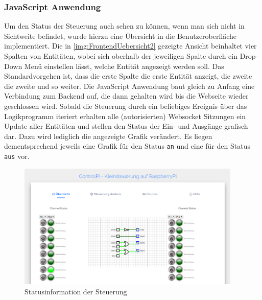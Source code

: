\subsubsection{JavaScript Anwendung}\label{chp:ums:JavaScriptFront}
Um den Status der Steuerung auch sehen zu können, wenn man sich nicht in Sichtweite befindet, wurde hierzu eine Übersicht in die Benutzeroberfläche implementiert. Die in \autoref{img:FrontendUebersicht2} gezeigte Ansicht beinhaltet vier Spalten von Entitäten, wobei sich oberhalb der jeweiligen Spalte durch ein Drop-Down Menü einstellen lässt, welche Entität angezeigt werden soll. Das Standardvorgehen ist, dass die erste Spalte die erste Entität anzeigt, die zweite die zweite und so weiter. Die JavaScript Anwendung baut gleich zu Anfang eine Verbindung zum Backend auf, die dann gehalten wird bis die Webseite wieder geschlossen wird. Sobald die Steuerung durch ein beliebiges Ereignis über das Logikprogramm iteriert erhalten alle (autorisierten) Websocket Sitzungen ein Update aller Entitäten und stellen den Status der Ein- und Ausgänge grafisch dar. Dazu wird lediglich die angezeigte Grafik verändert. Es liegen dementsprechend jeweils eine Grafik für den Status \texttt{an} und eine für den Status \texttt{aus} vor. 

 \begin{figure}[H]
	\begin{center}
		\includegraphics[width=0.95\textwidth]{./images/FrontendUebersicht.png}
		\caption{Statusinformation der Steuerung}
		\label{img:FrontendUebersicht2}
	\end{center} 
\end{figure}


